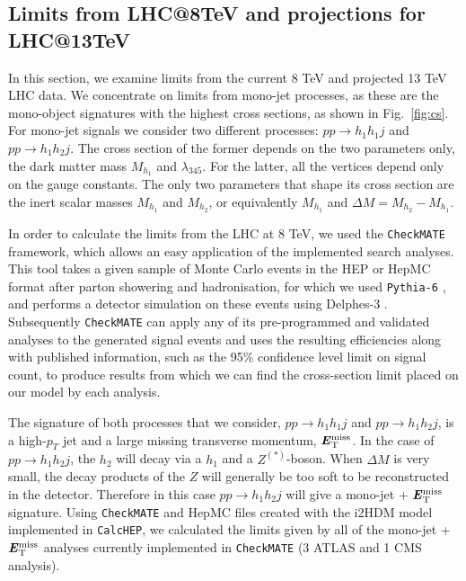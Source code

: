 \subsection{Limits from LHC@8TeV  and projections for LHC@13TeV}

In this section, we examine limits from the current 8 TeV and projected 13 TeV LHC data. 
We concentrate on limits from mono-jet processes, as these are the mono-object signatures
with the highest cross sections, as shown in Fig.~\ref{fig:cs}.
For mono-jet signals we consider two different processes: $pp\rightarrow h_1h_1j$ and $pp\rightarrow h_1h_2j$.
The cross section of the former depends on the two parameters only, the dark matter mass $M_{h_1}$ and $\lambda_{345}$. 
For the latter, all the vertices depend only on the gauge constants. The only two parameters that shape its cross section 
are the inert scalar masses $M_{h_1}$ and $M_{h_2}$, or equivalently $M_{h_1}$ and $\Delta M = M_{h_2} - M_{h_1}$. 

In order to calculate the limits from the LHC at 8 TeV, we used the {\tt CheckMATE}
\cite{Drees:2013wra,deFavereau:2013fsa,Cacciari:2011ma,Cacciari:2005hq,Cacciari:2008gp,Read:2002hq,Lester:1999tx,Barr:2003rg,Cheng:2008hk} framework, which allows an easy
application of the implemented search analyses. This tool takes a given sample of Monte Carlo events in the HEP or HepMC format after parton showering and hadronisation,
for which we used {\tt Pythia-6} \cite{Sjostrand:2006za}, and performs a detector simulation on these events using Delphes-3 \cite{deFavereau:2013fsa}. Subsequently {\tt CheckMATE} can
apply any of its pre-programmed and validated analyses to the generated signal events and uses the resulting efficiencies along with published information, such as the 95\%
confidence level limit on signal count, to produce results from which we can find the cross-section limit placed on our model by each analysis.

The signature of both processes that we consider, $pp\rightarrow h_1h_1j$  and $pp\rightarrow h_1h_2j$,
is a high-$p_T$ jet and a large missing transverse momentum, $\textbf{\textit{E}$_{\rm T}^{\rm miss}$}{}$. 
In the case of $pp\rightarrow h_1h_2j$, the $h_2$ will decay via a $h_1$ and a $Z^{(*)}$-boson. When $\Delta M$ is very small, the decay
products of the $Z$ will generally be too soft to be reconstructed in the detector. Therefore in this case $pp\rightarrow h_1h_2j$ will give a mono-jet + $\textbf{\textit{E}$_{\rm T}^{\rm miss}$}{}$
signature. Using {\tt CheckMATE} and HepMC files created with the i2HDM model implemented in {\tt CalcHEP}, we calculated the limits given by all of the mono-jet +
$\textbf{\textit{E}$_{\rm T}^{\rm miss}$}{}$ analyses currently implemented in {\tt CheckMATE} \cite{ATLAS:2012zim,Aad:2014nra,Aad:2015zva,Khachatryan:2014rra} (3 ATLAS and 1 CMS analysis).

